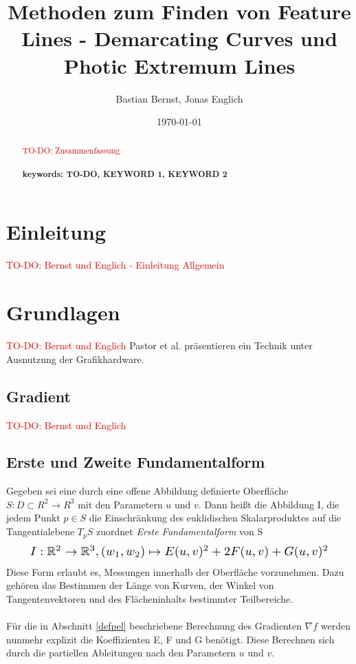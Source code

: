 \documentclass{paperStyle}
\title{Methoden zum Finden von Feature Lines - Demarcating Curves und Photic Extremum Lines}
\author{Bastian Bernst, Jonas Englich}
\date{\today}
\newcommand\todo[1]{\textcolor{red}{#1}}
\begin{document}
\maketitle

\begin{abstract}
   \todo{TO-DO: Zusammenfassung}\\
    \\
\textbf{keywords: TO-DO, KEYWORD 1, KEYWORD 2}

\end{abstract}

\section{Einleitung}
\todo{TO-DO: Bernst und Englich - Einleitung Allgemein}
\section{Grundlagen}
\todo{TO-DO: Bernst und Englich}
Pastor et al. \cite{Praun2001} präsentieren ein Technik unter Ausnutzung der Grafikhardware.


\subsection{Gradient}
\todo{TO-DO: Bernst und Englich}
\subsection{Erste und Zweite Fundamentalform}
\label{fundamental}
Gegeben sei eine durch eine offene Abbildung definierte Oberfläche $S : D \subset R^{2} \longrightarrow R^{3}$ mit den Parametern $u$ und $v$. Dann heißt die Abbildung I, die jedem Punkt $p \in S$ die Einschränkung des euklidischen Skalarproduktes auf die Tangentialebene $T_{p}S$ zuordnet \textit{Erste Fundamentalform} von S
\begin{equation}
\resizebox{.9\hsize}{!}{$
I: \mathbb{R}^{2} \rightarrow \mathbb{R}^{3}, (w_{1},w_{2}) \mapsto E(u,v)^{2} + 2F(u,v) + G(u,v)^{2}$}
\end{equation}	
Diese Form erlaubt es, Messungen innerhalb der Oberfläche vorzunehmen. Dazu gehören das Bestimmen der Länge von Kurven, der Winkel von Tangentenvektoren und des Flächeninhalts bestimmter Teilbereiche.
\\
\\
Für die in Abschnitt \ref{defpel} beschriebene Berechnung des Gradienten $\nabla f$ werden nunmehr explizit die Koeffizienten E, F und G benötigt. Diese Berechnen sich durch die partiellen Ableitungen nach den Parametern $u$ und $v$.
\end{document}
